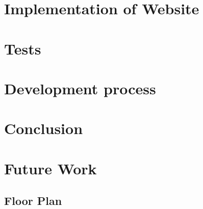 \chapter{Implementation of Website}


\chapter{Tests}



\chapter{Development process}



\chapter{Conclusion}
\label{chap:conclusion}

\chapter{Future Work}


\begin{appendices}
\chapter{Floor Plan}\label{appendixStart}

\label{appendixEnd}
\end{appendices}

\cleardoublepage
\listoffigures*


\cleardoublepage
\renewcommand{\lstlistlistingname}{List of Listings}%
\lstlistoflistings

\cleardoublepage
{}
\label{chap:bib}%


\label{lastpage}%

\ifthenelse{\isodd{\thepage}}
{%
}
{%
\pagebreak
\thispagestyle{empty}
\mbox{}
}


